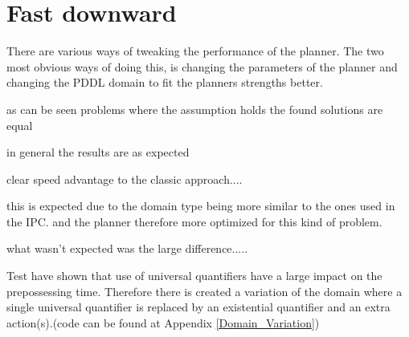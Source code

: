 \section{Fast downward}



	There are various ways of tweaking the performance of the planner. The two most obvious ways of doing this, is changing the parameters of the planner and changing the PDDL domain to fit the planners strengths better.

	
		
			
			as can be seen problems where the assumption holds the found solutions are equal
			
			
			in general the results are as expected
		
		
			clear speed advantage to the classic approach....
			
			this is expected due to the domain type being more similar to the ones used in the IPC. and the planner therefore more optimized for this kind of problem.
			
			what wasn't expected was the large difference.....
			
			
			 Test have shown that use of universal quantifiers have a large impact on the prepossessing time. Therefore there is created a variation of the domain where a single universal quantifier is replaced by an existential quantifier and an extra action(s).(code can be found at Appendix \ref{Domain_Variation})



